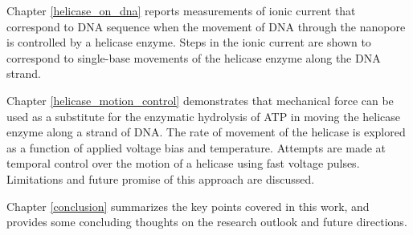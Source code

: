 

Chapter \ref{helicase_on_dna} reports measurements of ionic current that correspond to DNA sequence when the movement of DNA through the nanopore is controlled by a helicase enzyme.  Steps in the ionic current are shown to correspond to single-base movements of the helicase enzyme along the DNA strand.

Chapter \ref{helicase_motion_control} demonstrates that mechanical force can be used as a substitute for the enzymatic hydrolysis of ATP in moving the helicase enzyme along a strand of DNA.  The rate of movement of the helicase is explored as a function of applied voltage bias and temperature.  Attempts are made at temporal control over the motion of a helicase using fast voltage pulses.  Limitations and future promise of this approach are discussed.


Chapter \ref{conclusion} summarizes the key points covered in this work, and provides some concluding thoughts on the research outlook and future directions.